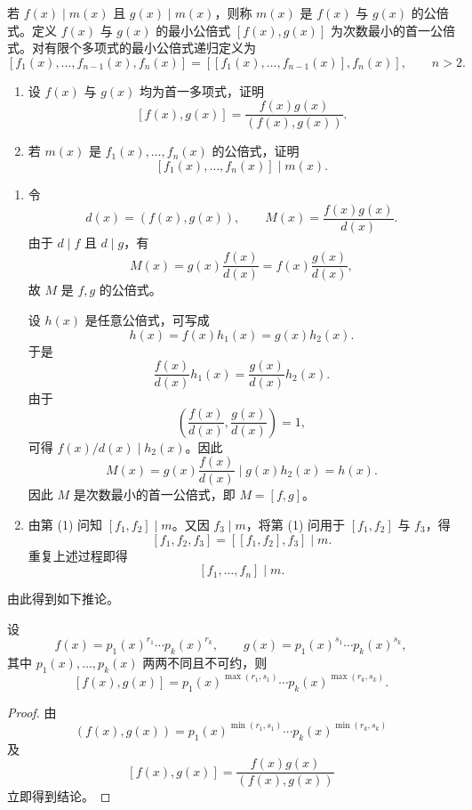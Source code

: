 \begin{problem}
\label{p1:concept:c1-l2164}若 \(f(x)\mid m(x)\) 且 \(g(x)\mid m(x)\)，则称 \(m(x)\) 是 \(f(x)\) 与 \(g(x)\) 的公倍式。定义 \(f(x)\) 与 \(g(x)\) 的最小公倍式 \([f(x),g(x)]\) 为次数最小的首一公倍式。对有限个多项式的最小公倍式递归定义为
	\[
	[f_1(x),\ldots,f_{n-1}(x),f_n(x)]
	=[[f_1(x),\ldots,f_{n-1}(x)],f_n(x)],
	\qquad n>2.
	\]
	\begin{enumerate}
		\item 设 \(f(x)\) 与 \(g(x)\) 均为首一多项式，证明
		\[
		[f(x),g(x)]=\frac{f(x)g(x)}{(f(x),g(x))}.
		\]
		\item 若 \(m(x)\) 是 \(f_1(x),\ldots,f_n(x)\) 的公倍式，证明
		\[
		[f_1(x),\ldots,f_n(x)]\mid m(x).
		\]
	\end{enumerate}
\end{problem}

\begin{solution}
	\begin{enumerate}
		\item 令
		\[
		d(x)=(f(x),g(x)),
		\qquad M(x)=\frac{f(x)g(x)}{d(x)}.
		\]
		由于 \(d\mid f\) 且 \(d\mid g\)，有
		\[
		M(x)=g(x)\frac{f(x)}{d(x)}=f(x)\frac{g(x)}{d(x)},
		\]
		故 \(M\) 是 \(f,g\) 的公倍式。
		
		设 \(h(x)\) 是任意公倍式，可写成
		\[
		h(x)=f(x)h_1(x)=g(x)h_2(x).
		\]
		于是
		\[
		\frac{f(x)}{d(x)}h_1(x)=\frac{g(x)}{d(x)}h_2(x).
		\]
		由于
		\[
		\left(\frac{f(x)}{d(x)},\frac{g(x)}{d(x)}\right)=1,
		\]
		可得 \(f(x)/d(x)\mid h_2(x)\)。因此
		\[
		M(x)=g(x)\frac{f(x)}{d(x)}\mid g(x)h_2(x)=h(x).
		\]
		因此 \(M\) 是次数最小的首一公倍式，即 \(M=[f,g]\)。
		
		\item 由第 (1) 问知 \([f_1,f_2]\mid m\)。又因 \(f_3\mid m\)，将第 (1) 问用于 \([f_1,f_2]\) 与 \(f_3\)，得
		\[
		[f_1,f_2,f_3]=[[f_1,f_2],f_3]\mid m.
		\]
		重复上述过程即得
		\[
		[f_1,\ldots,f_n]\mid m.
		\]
	\end{enumerate}
\end{solution}

由此得到如下推论。

\begin{corollary}
	设
	\[
	f(x)=p_1(x)^{r_1}\cdots p_k(x)^{r_k},
	\qquad
	g(x)=p_1(x)^{s_1}\cdots p_k(x)^{s_k},
	\]
	其中 \(p_1(x),\ldots,p_k(x)\) 两两不同且不可约，则
	\[
	[f(x),g(x)]
	=p_1(x)^{\max(r_1,s_1)}\cdots p_k(x)^{\max(r_k,s_k)}.
	\]
\end{corollary}

\begin{proof}
	由
	\[
	(f(x),g(x))
	=p_1(x)^{\min(r_1,s_1)}\cdots p_k(x)^{\min(r_k,s_k)}
	\]
	及
	\[
	[f(x),g(x)]=\frac{f(x)g(x)}{(f(x),g(x))}
	\]
	立即得到结论。
\end{proof}

